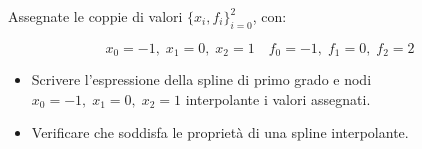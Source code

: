Assegnate le coppie di valori $\{x_i,f_i \}_{i=0}^2$, con:

$$x_0=-1, \; x_1=0, \; x_2=1 \quad f_0=-1, \; f_1=0, \; f_2=2$$

\begin{itemize}
\item Scrivere l'espressione della spline di primo grado e nodi
$x_0=-1, \; x_1=0, \; x_2=1$ interpolante i valori assegnati.
\item Verificare che soddisfa le propriet\`{a} di una spline interpolante.

\end{itemize}
